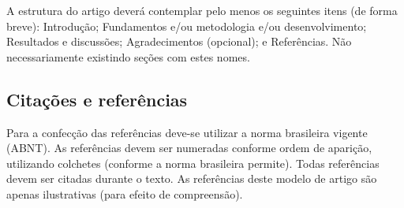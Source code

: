 \documentclass[12pt, a4paper, twoside, twocolumn]{article}
\begin{document}

A estrutura do artigo deverá contemplar pelo menos os seguintes itens (de forma breve):
Introdução; Fundamentos e/ou metodologia e/ou desenvolvimento; Resultados e discussões; Agradecimentos (opcional); e Referências. Não necessariamente existindo seções com estes nomes. 
%
%


\subsection{Citações e referências}

Para a confecção das referências deve-se utilizar a norma brasileira vigente (ABNT). As referências devem ser numeradas conforme ordem de aparição, utilizando colchetes \cite{Mareze-2019} (conforme a norma brasileira permite). Todas referências devem ser citadas durante o texto. As referências \cite{Mareze-2017,Fonseca-2013,Brandao-2017,Oppenheim-2010,Muller-2001,Mareze-2019,Borges-2018,Ristow-2016} deste modelo de artigo são apenas ilustrativas (para efeito de compreensão).
%
\end{document}
